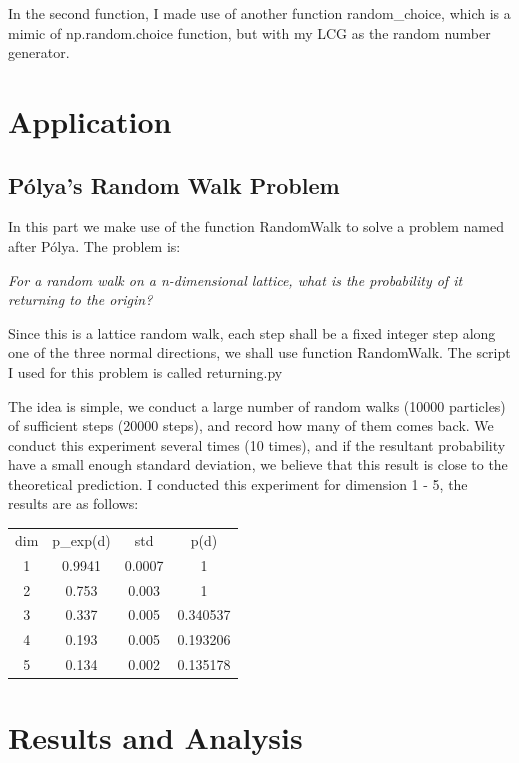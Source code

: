 \documentclass{article}
\begin{document}
In the second function, I made use of another function random\_choice, which is a 
mimic of np.random.choice function, but with my LCG as the random number generator.

\section{Application}

\subsection{P\'olya's Random Walk Problem}

In this part we make use of the function RandomWalk to solve a problem named after  
P\'olya. The problem is:

\begin{center}
	\textit{
	For a random walk on a n-dimensional lattice, what is the probability of it
	returning to the origin?
	}
\end{center}

Since this is a lattice random walk, each step shall be a fixed integer step along one
of the three normal directions, we shall use function RandomWalk. The script I used for
this problem is called returning.py

The idea is simple, we conduct a large number of random walks (10000 particles) of 
sufficient steps (20000 steps), and record how many of them comes back. We conduct 
this experiment several times (10 times), and if the resultant probability have a small 
enough standard deviation, we believe that this result is close to the theoretical 
prediction. I conducted this experiment for dimension 1 - 5, the results are as follows:

\begin{center}
\begin{tabular}{ c c c c }
	dim & p\_exp(d) & std & p(d) \\
	1 & 0.9941& 0.0007& 1 \\
	2 & 0.753& 0.003& 1 \\
	3 & 0.337& 0.005& 0.340537 \\
	4 & 0.193& 0.005& 0.193206 \\
	5 & 0.134& 0.002& 0.135178
\end{tabular}
\end{center}

\section{Results and Analysis}
\end{document}

